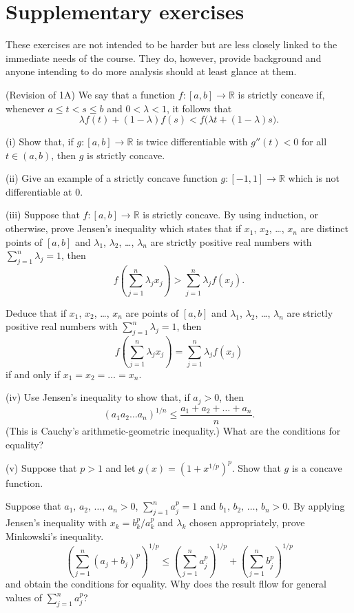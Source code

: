 \section{Supplementary exercises} These exercises are not intended to be harder
but are less closely linked 
to the immediate needs of the course. 
They do, however,
provide background and anyone intending to do more analysis should at least
glance at them.

\begin{exercise}\label{C5.1} (Revision of 1A)
We say that a function 
$f:[a,b]\rightarrow{\mathbb R}$ is strictly concave if, whenever
$a\leq t<s\leq b$ and $0<\lambda<1$, it follows that
\[\lambda f(t)+(1-\lambda) f(s)<f\big(\lambda t+(1-\lambda)s).\]

(i) Show that, if $g:[a,b]\rightarrow{\mathbb R}$ is twice differentiable
with $g''(t)<0$ for all $t\in(a,b)$, then $g$ is strictly concave.

(ii) Give an example of a strictly concave function
$g:[-1,1]\rightarrow{\mathbb R}$ which is not differentiable
at $0$.

(iii) Suppose that $f:[a,b]\rightarrow{\mathbb R}$ is strictly concave.
By using induction, or otherwise, prove
Jensen's inequality which states that
if $x_{1}$, $x_{2}$, \dots, $x_{n}$ are distinct points of
$[a,b]$ and $\lambda_{1}$, $\lambda_{2}$, \dots, $\lambda_{n}$
are strictly positive real numbers with 
$\sum_{j=1}^{n}\lambda_{j}=1$, then
\[f\left(\sum_{j=1}^{n}\lambda_{j}x_{j}\right)
>\sum_{j=1}^{n}\lambda_{j}f(x_{j}).\]

Deduce that if $x_{1}$, $x_{2}$, \dots, $x_{n}$ are points of
$[a,b]$ and $\lambda_{1}$, $\lambda_{2}$, \dots, $\lambda_{n}$
are strictly positive real numbers with
$\sum_{j=1}^{n}\lambda_{j}=1$, then
\[f\left(\sum_{j=1}^{n}\lambda_{j}x_{j}\right)
=\sum_{j=1}^{n}\lambda_{j}f(x_{j})\]
if and only if $x_{1}=x_{2}=\dots=x_{n}$.

(iv) Use Jensen's inequality to show that, if $a_{j}>0$, then
\[(a_{1}a_{2}\dots a_{n})^{1/n}\leq \frac{a_{1}+a_{2}+\dots+a_{n}}{n}.\]
(This is Cauchy's arithmetic-geometric inequality.)
What are the conditions for equality?

 
(v) Suppose that $p>1$ and let $g(x)=(1+x^{1/p})^{p}$.
Show that $g$ is a concave function.

Suppose that $a_{1},\,a_{2},\,\dots,\,a_{n}>0$,
$\sum_{j=1}^{n}a_{j}^{p}=1$
and $b_{1},\,b_{2},\,\dots,\,b_{n}>0$.
By applying Jensen's inequality with
$x_{k}=b_{k}^{p}/a_{k}^{p}$ and $\lambda_{k}$
chosen appropriately, prove Minkowski's inequality.
\[\left(\sum_{j=1}^{n}(a_{j}+b_{j})^{p}\right)^{1/p}
\leq \left(\sum_{j=1}^{n}a_{j}^{p}\right)^{1/p}
+\left(\sum_{j=1}^{n}b_{j}^{p}\right)^{1/p}\]
and obtain the conditions for equality.
Why does the result 
fllow for general values of $\sum_{j=1}^{n}a_{j}^{p}$?
\end{exercise}
